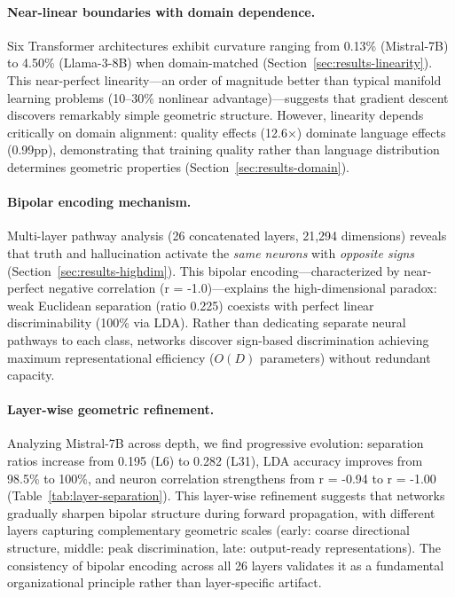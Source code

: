 \documentclass[11pt]{article}
\begin{document}
\paragraph{Near-linear boundaries with domain dependence.} Six Transformer architectures exhibit
curvature ranging from 0.13\% (Mistral-7B) to 4.50\% (Llama-3-8B) when domain-matched (Section~\ref{sec:results-linearity}). This near-perfect linearity---an order of magnitude better than typical manifold learning
problems (10--30\% nonlinear advantage)---suggests that gradient descent discovers remarkably simple geometric structure. However, linearity depends critically on domain alignment: quality effects (12.6×) dominate language effects (0.99pp), demonstrating that training quality rather than language distribution determines geometric properties (Section~\ref{sec:results-domain}).

\paragraph{Bipolar encoding mechanism.} Multi-layer pathway analysis (26 concatenated layers, 21,294 dimensions) reveals that truth and hallucination activate the \textit{same neurons} with \textit{opposite signs} (Section~\ref{sec:results-highdim}). This bipolar encoding---characterized by near-perfect negative correlation (r = -1.0)---explains the high-dimensional paradox: weak Euclidean separation (ratio 0.225) coexists with perfect linear discriminability (100\% via LDA). Rather than dedicating separate neural pathways to each class, networks discover sign-based discrimination achieving maximum representational efficiency ($O(D)$ parameters) without redundant capacity.

\paragraph{Layer-wise geometric refinement.} Analyzing Mistral-7B across depth, we find progressive
evolution: separation ratios increase from 0.195 (L6) to 0.282 (L31), LDA accuracy improves from 98.5\% to 100\%, and neuron correlation strengthens from r = -0.94 to r = -1.00 (Table~\ref{tab:layer-separation}). This layer-wise refinement suggests that networks gradually sharpen bipolar structure during forward propagation, with different layers capturing complementary geometric scales (early: coarse directional structure, middle: peak discrimination, late: output-ready representations). The consistency of bipolar encoding across all 26 layers validates it as a fundamental organizational principle rather than layer-specific artifact.
\end{document}
